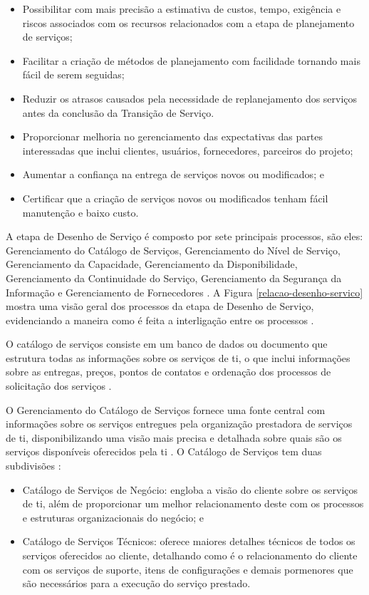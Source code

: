 \begin{itemize}
    \item Possibilitar com mais precisão a estimativa de custos, tempo, exigência e riscos associados com os recursos relacionados com a etapa de planejamento de serviços;
    \item Facilitar a criação de métodos de planejamento com facilidade tornando mais fácil de serem seguidas;
    \item Reduzir os atrasos causados pela necessidade de replanejamento dos serviços antes da conclusão da Transição de Serviço.
    \item Proporcionar melhoria no gerenciamento das expectativas das partes interessadas que inclui clientes, usuários, fornecedores, parceiros do projeto;
    \item Aumentar a confiança na entrega de serviços novos ou modificados; e
    \item Certificar que a criação de serviços novos ou modificados tenham fácil manutenção e baixo custo.
\end{itemize}

A etapa de Desenho de Serviço é composto por sete principais processos, são eles: Gerenciamento do Catálogo de Serviços, Gerenciamento do Nível de Serviço, Gerenciamento da Capacidade, Gerenciamento da Disponibilidade, Gerenciamento da Continuidade do Serviço, Gerenciamento da Segurança da Informação e Gerenciamento de Fornecedores \cite{abreu2012implantando}. A Figura \ref{relacao-desenho-servico} mostra uma visão geral dos processos da etapa de Desenho de Serviço, evidenciando a maneira como é feita a interligação entre os processos \cite{abreu2012implantando}.

O catálogo de serviços consiste em um banco de dados ou documento que estrutura todas as informações sobre os serviços de \acrshort{ti}, o que inclui informações sobre as entregas, preços, pontos de contatos e ordenação dos processos de solicitação dos serviços \cite{servicedesign}.

O Gerenciamento do Catálogo de Serviços fornece uma fonte central com informações sobre os serviços entregues pela organização prestadora de serviços de \acrshort{ti}, disponibilizando uma visão mais precisa e detalhada sobre quais são os serviços disponíveis oferecidos pela \acrshort{ti} \cite{introductoryoverviewofitil}. O Catálogo de Serviços tem duas subdivisões \cite{abreu2012implantando}:

\begin{itemize}
    \item Catálogo de Serviços de Negócio: engloba a visão do cliente sobre os serviços de \acrshort{ti}, além de proporcionar um melhor relacionamento deste com os processos e estruturas organizacionais do negócio; e
    \item Catálogo de Serviços Técnicos: oferece maiores detalhes técnicos de todos os serviços oferecidos ao cliente, detalhando como é o relacionamento do cliente com os serviços de suporte, itens de configurações e demais pormenores que são necessários para a execução do serviço prestado.
\end{itemize}

